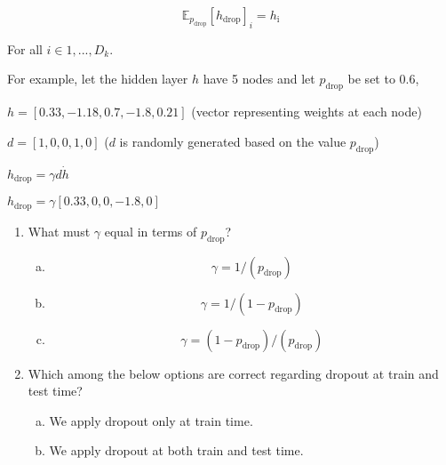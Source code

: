 \begin{enumerate}[1.]
\begin{equation*}
   \mathbb{E}_{p_{\text{drop}}}[h_\text{drop}]_i = h_{\text{i}}
\end{equation*}

For all $i \in {1,...,D_k}$.

For example, let the hidden layer $h$ have 5 nodes and let $p_\text{drop}$ be set to 0.6,

$h = [0.33, -1.18, 0.7, -1.8, 0.21]$ (vector representing weights at each node)

$d = [1, 0, 0, 1, 0]$  ($d$ is randomly generated based on the value $p_\text{drop}$)

$h_\text{drop} = \gamma d\dot h$

$h_\text{drop} = \gamma [0.33, 0, 0, -1.8, 0]$

\begin{enumerate}[3a.]

\item {} What must $\gamma$ equal in terms of $p_\text{drop}$?

\begin{enumerate}[(a)]
\item \begin{equation*}\gamma = 1 / (p_{\text{drop}})\end{equation*}
\item \begin{equation*}\gamma = 1 / (1 - p_{\text{drop}})\end{equation*}
\item \begin{equation*}\gamma = (1 - p_{\text{drop}}) / (p_{\text{drop}})\end{equation*}
\end{enumerate}


\item {} Which among the below options are correct regarding dropout at train and test time?

\begin{enumerate}[(a)]
\item We apply dropout only at train time.
\item We apply dropout at both train and test time.
\end{enumerate}


\end{enumerate}


\end{enumerate}
